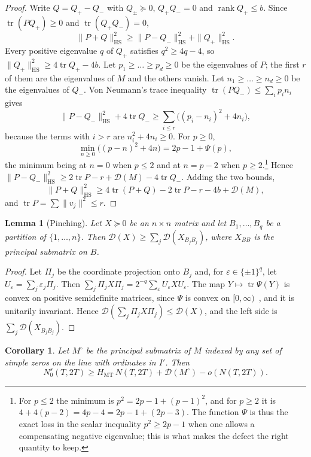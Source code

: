 \documentclass[aps,prd,twocolumn,superscriptaddress,nofootinbib,longbibliography,floatfix,showkeys,amsmath,amssymb,10pt]{revtex4-2}
\newtheorem{lemma}[theorem]{Lemma}
\newtheorem{corollary}[theorem]{Corollary}
\theoremstyle{definition}
\theoremstyle{remark}
\newcommand{\cD}{\mathcal{D}}
\newcommand{\HS}{\mathrm{HS}}
\newcommand{\MT}{\mathrm{MT}}
\DeclareMathOperator{\tr}{tr}
\DeclareMathOperator{\rank}{rank}
\begin{document}
\begin{proof}
Write $Q=Q_+-Q_-$ with $Q_\pm\succeq0$, $Q_+Q_-=0$ and $\rank Q_+\le b$.
Since $\tr(PQ_+)\ge0$ and $\tr(Q_+Q_-)=0$,
\[
 \|P+Q\|_\HS^2\ge\|P-Q_-\|_\HS^2+\|Q_+\|_\HS^2.
\]
Every positive eigenvalue $q$ of $Q_+$ satisfies $q^2\ge4q-4$, so
$\|Q_+\|_\HS^2\ge4\tr Q_+-4b$. Let $p_1\ge\dots\ge p_d\ge0$ be the
eigenvalues of $P$; the first $r$ of them are the eigenvalues of $M$ and the
others vanish. Let $n_1\ge\dots\ge n_d\ge0$ be the eigenvalues of $Q_-$.
Von Neumann's trace inequality $\tr(PQ_-)\le\sum_ip_in_i$ gives
\[
 \|P-Q_-\|_\HS^2+4\tr Q_-\ge\sum_{i\le r}\bigl((p_i-n_i)^2+4n_i\bigr),
\]
because the terms with $i>r$ are $n_i^2+4n_i\ge0$. For $p\ge0$,
\[
 \min_{n\ge0}\bigl((p-n)^2+4n\bigr)=2p-1+\Psi(p),
\]
the minimum being at $n=0$ when $p\le2$ and at $n=p-2$ when
$p\ge2$.\footnote{For $p\le2$ the minimum is $p^2=2p-1+(p-1)^2$, and for
$p\ge2$ it is $4+4(p-2)=4p-4=2p-1+(2p-3)$. The function $\Psi$ is thus the
exact loss in the scalar inequality $p^2\ge2p-1$ when one allows a
compensating negative eigenvalue; this is what makes the defect the right
quantity to keep.} Hence
$\|P-Q_-\|_\HS^2\ge2\tr P-r+\cD(M)-4\tr Q_-$. Adding the two bounds,
\[
 \|P+Q\|_\HS^2\ge4\tr(P+Q)-2\tr P-r-4b+\cD(M),
\]
and $\tr P=\sum\|v_j\|^2\le r$.
\end{proof}

\begin{lemma}[Pinching]\label{lem:pinch}
Let $X\succeq0$ be an $n\times n$ matrix and let $B_1,\dots,B_q$ be a
partition of $\{1,\dots,n\}$. Then
$\cD(X)\ge\sum_{j}\cD(X_{B_jB_j})$, where $X_{BB}$ is the principal
submatrix on $B$.
\end{lemma}

\begin{proof}
Let $\Pi_j$ be the coordinate projection onto $B_j$ and, for
$\varepsilon\in\{\pm1\}^q$, let $U_\varepsilon=\sum_j\varepsilon_j\Pi_j$.
Then $\sum_j\Pi_jX\Pi_j=2^{-q}\sum_\varepsilon U_\varepsilon XU_\varepsilon$.
The map $Y\mapsto\tr\Psi(Y)$ is convex on positive semidefinite matrices,
since $\Psi$ is convex on $[0,\infty)$~\cite[Theorem V.2.5]{Bha97}, and it
is unitarily invariant. Hence
$\cD(\sum_j\Pi_jX\Pi_j)\le\cD(X)$, and the left side is
$\sum_j\cD(X_{B_jB_j})$.
\end{proof}

\begin{corollary}\label{cor:defect}
Let $M^\circ$ be the principal submatrix of $M$ indexed by any set of simple
zeros on the line with ordinates in $I'$. Then
\[
 N_0^s(T,2T)\ge H_\MT\,N(T,2T)+\cD(M^\circ)-o(N(T,2T)).
\]
\end{corollary}
\end{document}
